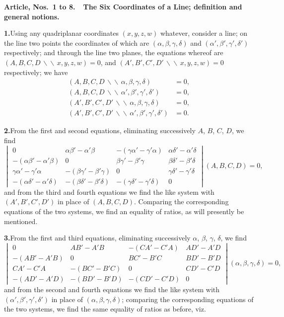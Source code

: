 \documentclass[11pt,a4paper]{article}
\begin{document}
\medskip
\noindent\textbf{Article, Nos.~1 to 8.\ \ The Six Coordinates of a Line;
definition and general notions.}
\medskip

\textbf{1.}\quad Using any quadriplanar coordinates $(x, y, z, w)$ whatever,
consider a line; on the line two points the coordinates of which are
$(\alpha, \beta, \gamma, \delta)$ and $(\alpha', \beta', \gamma', \delta')$
respectively; and through the line two planes, the equations whereof are
$(A, B, C, D \,\backslash\!\!\backslash\, x, y, z, w) = 0$, and
$(A', B', C', D' \,\backslash\!\!\backslash\, x, y, z, w) = 0$ respectively; we have
\begin{align*}
(A, B, C, D \,\backslash\!\!\backslash\, \alpha, \beta, \gamma, \delta) &= 0, \\
(A, B, C, D \,\backslash\!\!\backslash\, \alpha', \beta', \gamma', \delta') &= 0, \\
(A', B', C', D' \,\backslash\!\!\backslash\, \alpha, \beta, \gamma, \delta) &= 0, \\
(A', B', C', D' \,\backslash\!\!\backslash\, \alpha', \beta', \gamma', \delta') &= 0.
\end{align*}

\textbf{2.}\quad From the first and second equations, eliminating successively
$A$, $B$, $C$, $D$, we find
\[
\renewcommand{\arraystretch}{1.15}
\begin{vmatrix}
0 & \alpha\beta' - \alpha'\beta & -(\gamma\alpha' - \gamma'\alpha) & \alpha\delta' - \alpha'\delta \\
-(\alpha\beta' - \alpha'\beta) & 0 & \beta\gamma' - \beta'\gamma & \beta\delta' - \beta'\delta \\
\gamma\alpha' - \gamma'\alpha & -(\beta\gamma' - \beta'\gamma) & 0 & \gamma\delta' - \gamma'\delta \\
-(\alpha\delta' - \alpha'\delta) & -(\beta\delta' - \beta'\delta) & -(\gamma\delta' - \gamma'\delta) & 0
\end{vmatrix}(A, B, C, D) = 0,
\]
and from the third and fourth equations we find the like system with
$(A', B', C', D')$ in place of $(A, B, C, D)$. Comparing the corresponding
equations of the two systems, we find an equality of ratios, as will presently
be mentioned.

\textbf{3.}\quad From the first and third equations, eliminating successively
$\alpha$, $\beta$, $\gamma$, $\delta$, we find
\[
\renewcommand{\arraystretch}{1.15}
\begin{vmatrix}
0 & AB' - A'B & -(CA' - C'A) & AD' - A'D \\
-(AB' - A'B) & 0 & BC' - B'C & BD' - B'D \\
CA' - C'A & -(BC' - B'C) & 0 & CD' - C'D \\
-(AD' - A'D) & -(BD' - B'D) & -(CD' - C'D) & 0
\end{vmatrix}(\alpha, \beta, \gamma, \delta) = 0,
\]
and from the second and fourth equations we find the like system with
$(\alpha', \beta', \gamma', \delta')$ in place of $(\alpha, \beta, \gamma, \delta)$;
comparing the corresponding equations of the two systems, we find the same
equality of ratios as before, viz.
\end{document}
